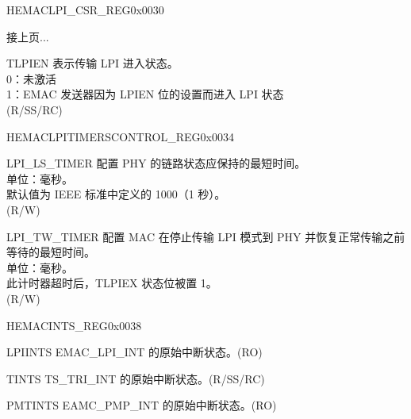 \addtocounter{Regfloat}{-1}
\begin{register}{H}{EMACLPI\_CSR\_REG}{0x0030}
\begin{regdesc}\begin{reglist}
\item[接上页...]

\item [TLPIEN] 表示传输 LPI 进入状态。\\
0：未激活\\
1：EMAC 发送器因为 LPIEN 位的设置而进入 LPI 状态\\(R/SS/RC)
\end{reglist}\end{regdesc}
\end{register}


\begin{register}{H}{EMACLPITIMERSCONTROL\_REG}{0x0034}\label{regdesc:EMACLPITIMERSCONTROLREG}
%
%
%
\regnewline%
\begin{regdesc}\begin{reglist}
\item [LPI\_LS\_TIMER] 配置 PHY 的链路状态应保持的最短时间。\\
单位：毫秒。\\
默认值为 IEEE 标准中定义的 1000（1 秒）。\\ (R/W)
\item [LPI\_TW\_TIMER] 配置 MAC 在停止传输 LPI 模式到 PHY 并恢复正常传输之前等待的最短时间。\\
单位：毫秒。\\
此计时器超时后，TLPIEX 状态位被置 1。\\ (R/W)
\end{reglist}\end{regdesc}
\end{register}

\begin{register}{H}{EMACINTS\_REG}{0x0038}\label{regdesc:EMACINTSREG}
%
%
%
%
%
%
\regnewline%
\begin{regdesc}\begin{reglist}
\item [LPIINTS] EMAC\_LPI\_INT 的原始中断状态。(RO)
\item [TINTS] TS\_TRI\_INT 的原始中断状态。(R/SS/RC)
\item [PMTINTS] EAMC\_PMP\_INT 的原始中断状态。(RO)
\end{reglist}\end{regdesc}
\end{register}


